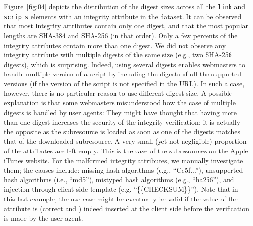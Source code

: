 \documentclass[sigconf,table]{acmart}
\begin{document}
Figure~\ref{fig:04} depicts the distribution of the digest sizes across all the \texttt{link} and \texttt{scripts} elements with an integrity attribute in the dataset. It can be observed that most integrity attributes contain only one digest, and that the most popular lengths are SHA-384 and SHA-256 (in that order).
Only a few percents of the integrity attributes contain more than one digest.
We did not observe any integrity attribute with multiple digests of the same size (e.g., two SHA-256 digests), which is surprising. %
Indeed, using several digests enables webmasters to handle multiple version of a script by including the digests of all the supported versions (if the version of the script is not specified in the URL).
In such a case, however, there is no particular reason to use different digest size.
A possible explanation is that some webmasters misunderstood how the case of multiple digests is handled by user agents: They might have thought that having more than one digest increases the security of the integrity verification; it is actually the opposite as the subresource is loaded as soon as one of the digests matches that of the downloaded subresource.
A very small (yet not negligible) proportion of the attributes are left empty. This is the case of the subresources on the Apple iTunes website. For the malformed integrity attributes, we manually investigate them; the causes include: missing hash algorithms (e.g., ``Cq5f...''), unsupported hash algorithms (i.e., ``md5''), mistyped hash algorithms (e.g., ``ha256''), and injection through client-side template (e.g. ``\{\{CHECKSUM\}\}''). Note that in this last example, the use case might be eventually be valid if the value of the attribute is (correct and ) indeed inserted at the client side before the verification is made by the user agent.
\end{document}
